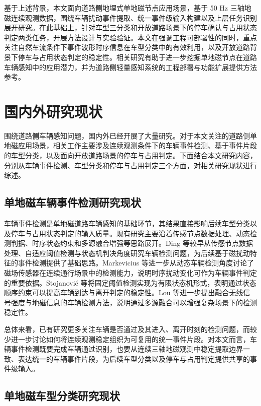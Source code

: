 \documentclass{xdupgthesis}
\begin{document}
基于上述背景，本文面向道路侧地埋式单地磁节点应用场景，基于 50 Hz 三轴地磁连续观测数据，围绕车辆扰动事件提取、统一事件级输入构建以及上层任务识别展开研究。在此基础上，针对车型三分类和开放道路场景下的停车确认与占用状态判定两类任务，开展方法设计与实验验证。本文在强调工程可部署性的同时，重点关注自然车流条件下事件波形时序信息在车型分类中的有效利用，以及开放道路背景下停车与占用状态判定的稳定性。相关研究有助于进一步挖掘单地磁节点在道路车辆感知中的应用潜力，并为道路侧轻量感知系统的工程部署与功能扩展提供方法参考。


\section{国内外研究现状}
\label{sec:related_work}

围绕道路侧车辆感知问题，国内外已经开展了大量研究。对于本文关注的道路侧单地磁应用场景，相关工作主要涉及连续观测条件下的车辆事件检测、基于事件片段的车型分类，以及面向开放道路场景的停车与占用判定。下面结合本文研究内容，分别从车辆事件检测、车型分类和停车与占用判定三个方面，对相关研究现状进行综述。

\subsection{单地磁车辆事件检测研究现状}
\label{sec:related_sensor_detection}

车辆事件检测是单地磁道路车辆感知的基础环节，其结果直接影响后续车型分类以及停车与占用状态判定的输入质量。现有研究主要沿着传感节点数据处理、动态检测判据、时序状态约束和多源融合增强等思路展开。Ding 等\cite{ch2_ding2004signal}较早从传感节点数据处理、自适应阈值检测与状态机判决角度研究车辆检测问题，为后续基于磁扰动特征的事件检测提供了基础思路。Markevicius 等\cite{R12}进一步从动态车辆检测角度讨论了磁场传感器在连续通行场景中的检测能力，说明时序扰动变化可作为车辆事件判定的重要依据。Stojanovi\'{c} 等\cite{stojanovic2025fsm}将固定阈值检测实现为有限状态机形式，表明通过状态顺序约束可以提高车辆到达与离开判定的稳定性。Lou 等\cite{R13}进一步提出融合无线信号强度与地磁信息的车辆检测方法，说明通过多源融合可以增强复杂场景下的检测稳定性。

总体来看，已有研究更多关注车辆是否通过及其进入、离开时刻的检测问题，而较少进一步讨论如何将连续观测稳定组织为可复用的统一事件片段。对本文而言，车辆事件检测既要完成车辆通过识别，也要从连续三轴地磁观测中稳定提取边界一致、表达统一的车辆事件片段，为后续车型分类以及停车与占用判定提供共享的事件级输入。

\subsection{单地磁车型分类研究现状}
\label{sec:related_vehicle_classification}
\end{document}
